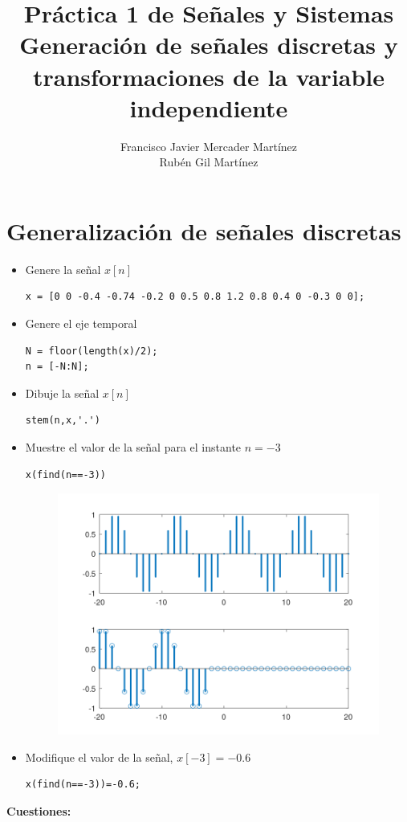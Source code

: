 \documentclass{article}
\title{Práctica 1 de Señales y Sistemas\\
Generación de señales discretas y transformaciones de 
la variable independiente}
\author{Francisco Javier Mercader Martínez\\ Rubén Gil Martínez}
\date{}
\begin{document}
\maketitle
\section{Generalización de señales discretas}
\begin{itemize}[label=$-$]
	\item Genere la señal $x[n]$
	
	\begin{lstlisting}
x = [0 0 -0.4 -0.74 -0.2 0 0.5 0.8 1.2 0.8 0.4 0 -0.3 0 0];
	\end{lstlisting}
	\item Genere el eje temporal
	
	\begin{lstlisting}
N = floor(length(x)/2);
n = [-N:N];
	\end{lstlisting}
	\item Dibuje la señal $x[n]$
	
	\begin{lstlisting}
stem(n,x,'.')
	\end{lstlisting}
	\item Muestre el valor de la señal para el instante $n=-3$
\begin{lstlisting}
x(find(n==-3))
\end{lstlisting}
\begin{figure}[h]
	\centering
	\includegraphics[width=\linewidth]{Imagénes/figure1}
\end{figure}
	\item Modifique el valor de la señal, $x[-3]=-0.6$
\begin{lstlisting}
x(find(n==-3))=-0.6;
\end{lstlisting}
\end{itemize}
\textbf{Cuestiones:}
\end{document}
